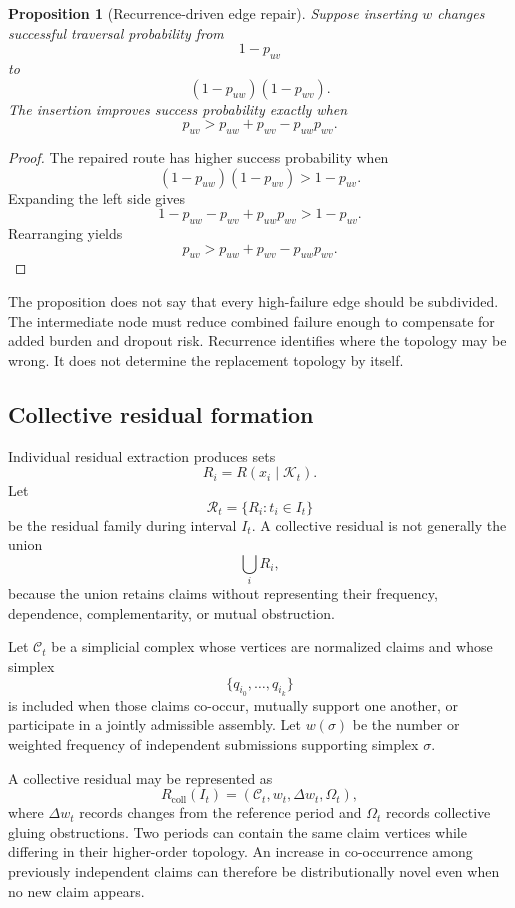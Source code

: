 \documentclass[11pt]{article}
\newtheorem{proposition}[definition]{Proposition}
\theoremstyle{definition}
\newcommand{\K}{\mathcal{K}}
\begin{document}
\begin{proposition}[Recurrence-driven edge repair]
Suppose inserting \(w\) changes successful traversal probability from
\[
1-p_{uv}
\]
to
\[
(1-p_{uw})(1-p_{wv}).
\]
The insertion improves success probability exactly when
\[
p_{uv}
>
p_{uw}+p_{wv}-p_{uw}p_{wv}.
\]
\end{proposition}

\begin{proof}
The repaired route has higher success probability when
\[
(1-p_{uw})(1-p_{wv})
>
1-p_{uv}.
\]
Expanding the left side gives
\[
1-p_{uw}-p_{wv}+p_{uw}p_{wv}
>
1-p_{uv}.
\]
Rearranging yields
\[
p_{uv}
>
p_{uw}+p_{wv}-p_{uw}p_{wv}.
\]
\end{proof}

The proposition does not say that every high-failure edge should be subdivided. The intermediate node must reduce combined failure enough to compensate for added burden and dropout risk. Recurrence identifies where the topology may be wrong. It does not determine the replacement topology by itself.

\subsection{Collective residual formation}

Individual residual extraction produces sets
\[
R_i=R(x_i\mid\K_t).
\]
Let
\[
\mathcal{R}_t
=
\{R_i:t_i\in I_t\}
\]
be the residual family during interval \(I_t\). A collective residual is not generally the union
\[
\bigcup_iR_i,
\]
because the union retains claims without representing their frequency, dependence, complementarity, or mutual obstruction.

Let \(\mathcal{C}_t\) be a simplicial complex whose vertices are normalized claims and whose simplex
\[
\{q_{i_0},\ldots,q_{i_k}\}
\]
is included when those claims co-occur, mutually support one another, or participate in a jointly admissible assembly. Let \(w(\sigma)\) be the number or weighted frequency of independent submissions supporting simplex \(\sigma\).

A collective residual may be represented as
\[
R_{\mathrm{coll}}(I_t)
=
\left(
\mathcal{C}_t,
w_t,
\Delta w_t,
\Omega_t
\right),
\]
where \(\Delta w_t\) records changes from the reference period and \(\Omega_t\) records collective gluing obstructions. Two periods can contain the same claim vertices while differing in their higher-order topology. An increase in co-occurrence among previously independent claims can therefore be distributionally novel even when no new claim appears.
\end{document}
